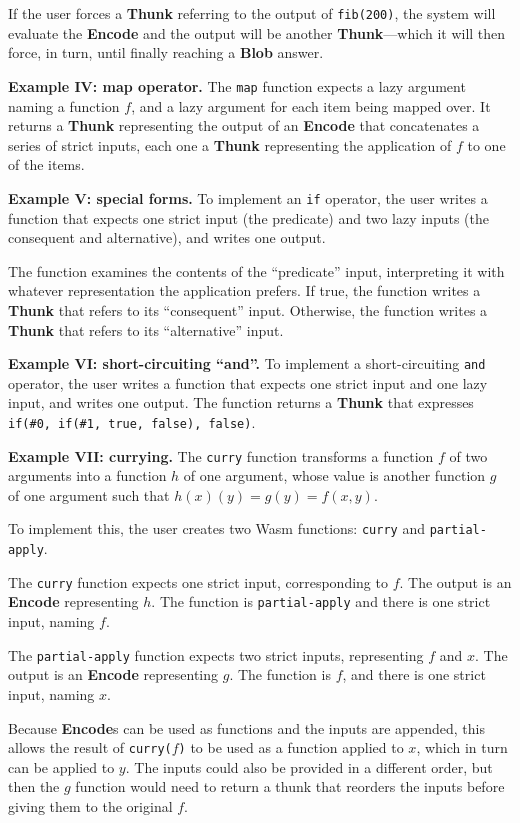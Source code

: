 \documentclass{article}
\newcommand{\blob}{\textbf{Blob}\xspace}
\newcommand{\encode}{\textbf{Encode}\xspace}
\newcommand{\thunk}{\textbf{Thunk}\xspace}
\newcommand{\encodes}{\textbf{Encode}s\xspace}
\begin{document}
If the user forces a \thunk referring to the output of \texttt{fib(200)}, the system will
evaluate the \encode and the output will be another \thunk---which it will then force, in turn,
until finally reaching a \blob answer.

\textbf{Example IV: map operator.} The \texttt{map} function expects a
lazy argument naming a function $f$, and a lazy argument for each item
being mapped over.  It returns a \thunk representing the output of an
\encode that concatenates a series of strict inputs, each one a \thunk
representing the application of $f$ to one of the items.

\textbf{Example V: special forms.} To implement an \texttt{if}
operator, the user writes a function that expects one strict
input (the predicate) and two lazy inputs (the consequent and
alternative), and writes one output.

The function examines the contents of the ``predicate'' input,
interpreting it with whatever representation the application prefers. If true, the function writes a \thunk
that refers to its ``consequent'' input. Otherwise, the function
writes a \thunk that refers to its ``alternative'' input.

\textbf{Example VI: short-circuiting ``and''.} To implement a
short-circuiting \texttt{and} operator, the user writes a function
that expects one strict input and one lazy input, and writes
one output. The function returns a \thunk that expresses \texttt{if(\#0,
  if(\#1, true, false), false)}.

\textbf{Example VII: currying.} The \texttt{curry} function transforms
a function $f$ of two arguments into a function $h$ of one argument,
whose value is another function $g$ of one argument such that $h(x)(y) =
g(y) = f(x,y)$.

To implement this, the user creates two Wasm functions: \texttt{curry} and \texttt{partial-apply}.

The \texttt{curry} function expects one strict input, corresponding to
$f$.  The output is an \encode representing $h$. The function is
\texttt{partial-apply} and there is one strict input, naming $f$.

The \texttt{partial-apply} function expects two strict inputs,
representing $f$ and $x$. The output is an \encode representing
$g$. The function is $f$, and there is one strict input, naming $x$.

Because \encodes can be used as functions and the inputs are appended,
this allows the result of \texttt{curry($f$)} to be used as a function
applied to $x$, which in turn can be applied to $y$. The inputs could
also be provided in a different order, but then the $g$ function would
need to return a thunk that reorders the inputs before giving them to
the original $f$.
\end{document}
